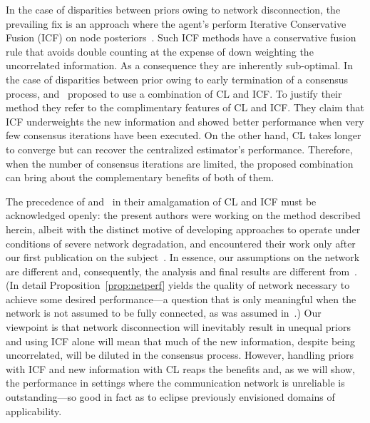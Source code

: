 \documentclass[journal]{IEEEtran}
\theoremstyle{remark}
\theoremstyle{definition}
\begin{document}
In the case of disparities between priors owing to network disconnection, the
prevailing fix is an approach where the agent's perform Iterative Conservative
Fusion (ICF) on node
posteriors~\cite{battistelli2014kullback,wang_distr_CI,hu2012diffusion}. Such
ICF methods have a conservative fusion rule that avoids double counting at the
expense of down weighting the uncorrelated information. As a consequence they
are inherently sub-optimal.
In the case of disparities between prior owing to early termination 
of a consensus process, \cite{battistelli2014parallel} and~\cite{battistelli2016stability} proposed to use a
combination of CL and ICF. To justify their method they refer to the complimentary
features of CL and ICF. They claim that ICF underweights the new information
and showed better performance when very few consensus iterations have been 
executed. On the other hand, CL takes longer to converge but can recover the
centralized estimator's performance. Therefore, when the number of consensus
iterations are limited, the proposed combination can bring about the
complementary benefits of both of them. 

The precedence of \cite{battistelli2014parallel}
and~\cite{battistelli2016stability} in their amalgamation of CL and ICF must be
acknowledged openly: the present authors were working on the method described herein,
albeit with the distinct motive of developing approaches to operate under
conditions of severe network degradation, and encountered their work only after
our first publication on the subject~\cite{tamjidi2016unifying}.  In essence,
our assumptions on the network are different and, consequently, the analysis
and final results are different from~\cite{battistelli2014parallel, battistelli2016stability}. (In detail  Proposition~\ref{prop:netperf} yields the quality of network necessary to
achieve some desired performance---a question that is only meaningful when the
network is not assumed to be fully connected, as was assumed
in~\cite{battistelli2014parallel, battistelli2016stability}.) Our viewpoint is
that network disconnection will inevitably result in unequal priors and using
ICF alone will mean that much of the new information, despite being
uncorrelated, will be diluted in the consensus process.  However, handling
priors with ICF and new information with CL reaps the benefits and, as we will
show, the performance in settings where the communication network is unreliable
is outstanding---so good in fact as to eclipse previously envisioned domains of
applicability.
\end{document}
